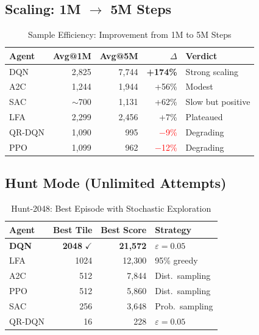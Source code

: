 \documentclass[conference, 10pt]{IEEEtran}
\begin{document}
\subsection{Scaling: 1M $\to$ 5M Steps}

\begin{table}[h]
\centering
\caption{Sample Efficiency: Improvement from 1M to 5M Steps}
\label{tab:scaling}
\setlength{\tabcolsep}{4pt}
\begin{tabular}{@{}lrrrl@{}}
\toprule
\textbf{Agent} & \textbf{Avg@1M} & \textbf{Avg@5M} & \textbf{$\Delta$} & \textbf{Verdict} \\
\midrule
\rowcolor{highlight}
DQN & 2,825 & 7,744 & \textcolor{dqnblue}{\textbf{+174\%}} & Strong scaling \\
A2C & 1,244 & 1,944 & +56\% & Modest \\
SAC & $\sim$700 & 1,131 & +62\% & Slow but positive \\
LFA & 2,299 & 2,456 & +7\% & Plateaued \\
QR-DQN & 1,090 & 995 & \textcolor{red}{$-$9\%} & Degrading \\
PPO & 1,099 & 962 & \textcolor{red}{$-$12\%} & Degrading \\
\bottomrule
\end{tabular}
\end{table}

\subsection{Hunt Mode (Unlimited Attempts)}

\begin{table}[h]
\centering
\caption{Hunt-2048: Best Episode with Stochastic Exploration}
\label{tab:hunt}
\setlength{\tabcolsep}{5pt}
\begin{tabular}{@{}lrrl@{}}
\toprule
\textbf{Agent} & \textbf{Best Tile} & \textbf{Best Score} & \textbf{Strategy} \\
\midrule
\rowcolor{highlight}
\textbf{DQN} & \textbf{2048} $\checkmark$ & \textbf{21,572} & $\varepsilon{=}0.05$ \\
LFA & 1024 & 12,300 & 95\% greedy \\
A2C & 512 & 7,844 & Dist.\ sampling \\
PPO & 512 & 5,860 & Dist.\ sampling \\
SAC & 256 & 3,648 & Prob.\ sampling \\
QR-DQN & 16 & 228 & $\varepsilon{=}0.05$ \\
\bottomrule
\end{tabular}
\end{table}
\end{document}
